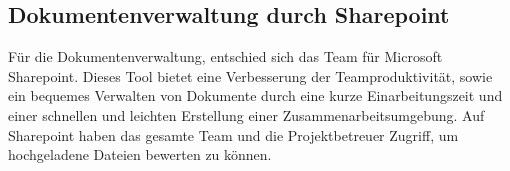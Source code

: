 \subsection{Dokumentenverwaltung durch Sharepoint}
Für die Dokumentenverwaltung, entschied sich das Team für Microsoft Sharepoint. Dieses Tool bietet eine Verbesserung der Teamproduktivität, sowie ein bequemes Verwalten von Dokumente durch eine kurze Einarbeitungszeit und einer schnellen und leichten Erstellung einer Zusammenarbeitsumgebung. Auf Sharepoint haben das gesamte Team und die Projektbetreuer Zugriff, um hochgeladene Dateien bewerten zu können.

